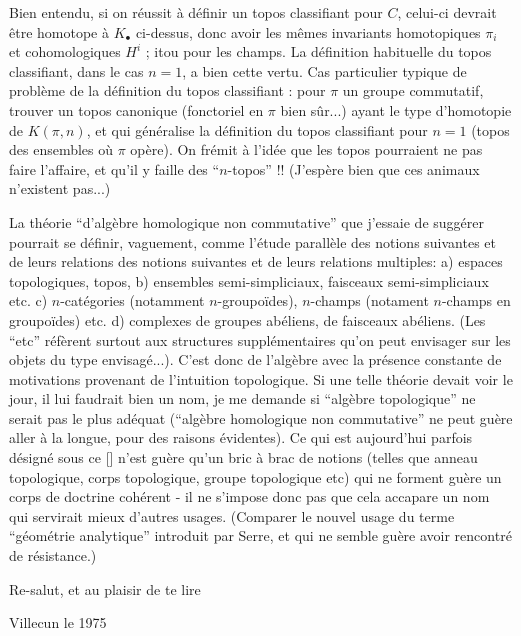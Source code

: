 Bien entendu, si on réussit à définir un topos classifiant pour $C$, celui-ci devrait être homotope à $K_\bullet$ ci-dessus, donc avoir les mêmes invariants homotopiques $\pi_i$ et cohomologiques $H^i$ ; itou pour les champs. La définition habituelle du topos classifiant, dans le cas $n = 1$, a bien cette vertu. Cas particulier typique de problème de la définition du topos classifiant : pour $\pi$ un groupe commutatif, trouver un topos canonique (fonctoriel en $\pi$ bien sûr...) ayant le type d'homotopie de $K(\pi, n)$, et qui généralise la définition du topos classifiant pour $n = 1$ (topos des ensembles où $\pi$ opère). On frémit à l'idée que les topos pourraient ne pas faire l'affaire, et qu'il y faille des ``$n$-topos'' !! (J'espère bien que ces animaux n'existent pas...)

\label{sec:app5}%
La théorie ``d'algèbre homologique non commutative'' que j'essaie de suggérer pourrait se définir, vaguement, comme l'étude parallèle des notions suivantes et de leurs relations des notions suivantes et de leurs relations multiples: a) espaces topologiques, topos, b) ensembles semi-simpliciaux, faisceaux semi-simpliciaux etc. c) $n$-catégories (notamment $n$-groupoïdes), $n$-champs (notament $n$-champs en groupoïdes) etc. d) complexes de groupes abéliens, de faisceaux abéliens. (Les ``etc'' réfèrent surtout aux structures supplémentaires qu'on peut envisager sur les objets du type envisagé...). C'est donc de l'algèbre avec la présence constante de motivations provenant de l'intuition topologique. Si une telle théorie devait voir le jour, il lui faudrait bien un nom, je me demande si ``algèbre topologique'' ne serait pas le plus adéquat (``algèbre homologique non commutative'' ne peut guère aller à la longue, pour des raisons évidentes). Ce qui est aujourd'hui parfois désigné sous ce [] n'est guère qu'un bric à brac de notions (telles que anneau topologique, corps topologique, groupe topologique etc) qui ne forment guère un corps de doctrine cohérent - il ne s'impose donc pas que cela accapare un nom qui servirait mieux d'autres usages. (Comparer le nouvel usage du terme ``géométrie analytique'' introduit par Serre, et qui ne semble guère avoir rencontré de résistance.)

Re-salut, et au plaisir de te lire

\bigskip

\par\hfill Villecun le 1975\par


